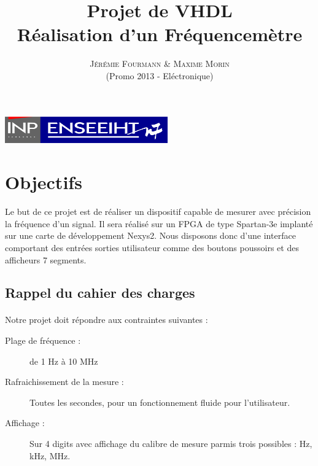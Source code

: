 \documentclass[a4paper,11pt]{article}
\title{\textbf{ \huge{Projet de VHDL}}  \\{\Large Réalisation d'un Fréquencemètre}}
\author{
\textsc{Jérémie Fourmann \& Maxime Morin}\\ %
\textsc{} (Promo 2013 - Eléctronique)\\ %
}
\begin{document}
\pagestyle{plain}

\maketitle
\begin{center}
\includegraphics[width=7cm]{inp-enseeiht.pdf}   
\end{center}

\vspace{.1cm}
\renewcommand{\contentsname}{Plan}
\setcounter{tocdepth}{2}
\tableofcontents
\vspace{.1cm}

\newpage
\section{Objectifs}
Le but de ce projet est de réaliser un dispositif capable de mesurer avec précision la fréquence d'un signal.
Il sera réalisé sur un FPGA de type Spartan-3e implanté sur une carte de développement Nexys2.
Nous disposons donc d'une interface comportant des entrées sorties utilisateur comme des boutons poussoirs et des 
afficheurs 7 segments.

\subsection{Rappel du cahier des charges}

\paragraph{} Notre projet doit répondre aux contraintes suivantes :

\begin{description}
\item[Plage de fréquence : ] de 1 Hz à 10 MHz
\item[Rafraichissement de la mesure :] Toutes les secondes, pour un fonctionnement fluide pour l'utilisateur.
\item[Affichage : ] Sur 4 digits avec affichage du calibre de mesure parmis trois possibles : Hz, kHz, MHz.
\end{description}
\end{document}
